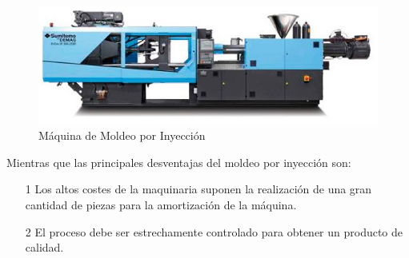 \documentclass[a4paper, 11pt]{article}
\begin{document}
\begin{figure}[h!] 
\centering
\captionsetup{justification=centering}
    \includegraphics[scale=0.75]{maquina_moldeo.png} 
     \caption{Máquina de Moldeo por Inyección}
    \label{maquina_moldeo}
\end{figure}

Mientras que las principales desventajas del moldeo por inyección son:
\begin{itemize}
\item[1] Los altos costes de la maquinaria suponen la realización de una gran cantidad de piezas para la amortización de la máquina.
\item[2] El proceso debe ser estrechamente controlado para obtener un producto de calidad.
\end{itemize}
\end{document}
